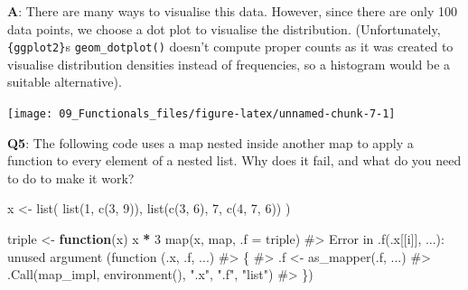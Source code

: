 \documentclass[
]{krantz}
\makeatletter
\newenvironment{Shaded}{\begin{snugshade}}{\end{snugshade}}
\newcommand{\CommentTok}[1]{\textcolor[rgb]{0.56,0.35,0.01}{\textit{#1}}}
\newcommand{\ControlFlowTok}[1]{\textcolor[rgb]{0.13,0.29,0.53}{\textbf{#1}}}
\newcommand{\DataTypeTok}[1]{\textcolor[rgb]{0.13,0.29,0.53}{#1}}
\newcommand{\DecValTok}[1]{\textcolor[rgb]{0.00,0.00,0.81}{#1}}
\newcommand{\FloatTok}[1]{\textcolor[rgb]{0.00,0.00,0.81}{#1}}
\newcommand{\KeywordTok}[1]{\textcolor[rgb]{0.13,0.29,0.53}{\textbf{#1}}}
\newcommand{\NormalTok}[1]{#1}
\newcommand{\OperatorTok}[1]{\textcolor[rgb]{0.81,0.36,0.00}{\textbf{#1}}}
\newcommand{\StringTok}[1]{\textcolor[rgb]{0.31,0.60,0.02}{#1}}
\newenvironment{kframe}{%
\medskip{}
\setlength{\fboxsep}{.8em}
 \def\at@end@of@kframe{}%
 \ifinner\ifhmode%
  \def\at@end@of@kframe{\end{minipage}}%
  \begin{minipage}{\columnwidth}%
 \fi\fi%
 \def\FrameCommand##1{\hskip\@totalleftmargin \hskip-\fboxsep
 \colorbox{shadecolor}{##1}\hskip-\fboxsep
     \hskip-\linewidth \hskip-\@totalleftmargin \hskip\columnwidth}%
 \MakeFramed {\advance\hsize-\width
   \@totalleftmargin\z@ \linewidth\hsize
   \@setminipage}}%
 {\par\unskip\endMakeFramed%
 \at@end@of@kframe}
\renewenvironment{Shaded}{\begin{kframe}}{\end{kframe}}
\renewcommand{\KeywordTok} [1]{\textcolor[rgb]{0.00,0.44,0.13}{{#1}}}
\renewcommand{\DataTypeTok}[1]{\textcolor[rgb]{0.56,0.13,0.00}{{#1}}}
\renewcommand{\DecValTok}  [1]{\textcolor[rgb]{0.25,0.63,0.44}{{#1}}}
\renewcommand{\FloatTok}   [1]{\textcolor[rgb]{0.25,0.63,0.44}{{#1}}}
\renewcommand{\StringTok}  [1]{\textcolor[rgb]{0.25,0.44,0.63}{{#1}}}
\renewcommand{\CommentTok} [1]{\textcolor[rgb]{0.38,0.63,0.69}{{#1}}}
\renewcommand{\NormalTok}  [1]{{#1}}
\makeatother
\begin{document}
\textbf{{A}}: There are many ways to visualise this data. However, since there are only 100 data points, we choose a dot plot to visualise the distribution. (Unfortunately, \texttt{\{ggplot2\}}s \texttt{geom\_dotplot()} doesn't compute proper counts as it was created to visualise distribution densities instead of frequencies, so a histogram would be a suitable alternative).

\begin{Shaded}
\end{Shaded}

\begin{center}\texttt{[image: 09\_Functionals\_files/figure-latex/unnamed-chunk-7-1]} \end{center}

\textbf{{Q5}}: The following code uses a map nested inside another map to apply a function to every element of a nested list. Why does it fail, and what do you need to do to make it work?

\begin{Shaded}
\begin{Highlighting}[]
\NormalTok{x <-}\StringTok{ }\KeywordTok{list}\NormalTok{(}
  \KeywordTok{list}\NormalTok{(}\DecValTok{1}\NormalTok{, }\KeywordTok{c}\NormalTok{(}\DecValTok{3}\NormalTok{, }\DecValTok{9}\NormalTok{)),}
  \KeywordTok{list}\NormalTok{(}\KeywordTok{c}\NormalTok{(}\DecValTok{3}\NormalTok{, }\DecValTok{6}\NormalTok{), }\DecValTok{7}\NormalTok{, }\KeywordTok{c}\NormalTok{(}\DecValTok{4}\NormalTok{, }\DecValTok{7}\NormalTok{, }\DecValTok{6}\NormalTok{))}
\NormalTok{)}

\NormalTok{triple <-}\StringTok{ }\ControlFlowTok{function}\NormalTok{(x) x }\OperatorTok{*}\StringTok{ }\DecValTok{3}
\KeywordTok{map}\NormalTok{(x, map, }\DataTypeTok{.f =}\NormalTok{ triple)}
\CommentTok{#> Error in .f(.x[[i]], ...): unused argument (function (.x, .f, ...)}
\CommentTok{#> \{}
\CommentTok{#> .f <- as_mapper(.f, ...)}
\CommentTok{#> .Call(map_impl, environment(), ".x", ".f", "list")}
\CommentTok{#> \})}
\end{Highlighting}
\end{Shaded}
\end{document}
